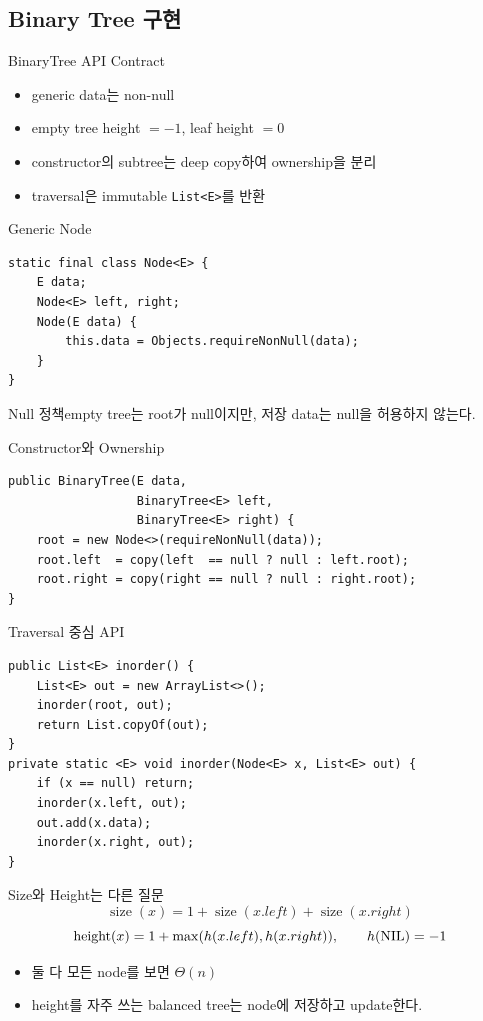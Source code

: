 \subsection{Binary Tree 구현}
\begin{frame}{BinaryTree API Contract}
\begin{itemize}
\item generic data는 non-null
\item empty tree height $=-1$, leaf height $=0$
\item constructor의 subtree는 deep copy하여 ownership을 분리
\item traversal은 immutable \texttt{List<E>}를 반환
\end{itemize}
\end{frame}
\begin{frame}[fragile]{Generic Node}
\begin{lstlisting}[style=jcode]
static final class Node<E> {
    E data;
    Node<E> left, right;
    Node(E data) {
        this.data = Objects.requireNonNull(data);
    }
}
\end{lstlisting}
\begin{block}{Null 정책}empty tree는 root가 null이지만, 저장 data는 null을 허용하지 않는다.\end{block}
\end{frame}
\begin{frame}[fragile]{Constructor와 Ownership}
\begin{lstlisting}[style=jcode]
public BinaryTree(E data,
                  BinaryTree<E> left,
                  BinaryTree<E> right) {
    root = new Node<>(requireNonNull(data));
    root.left  = copy(left  == null ? null : left.root);
    root.right = copy(right == null ? null : right.root);
}
\end{lstlisting}
\end{frame}
\begin{frame}[fragile]{Traversal 중심 API}
\begin{lstlisting}[style=jcode]
public List<E> inorder() {
    List<E> out = new ArrayList<>();
    inorder(root, out);
    return List.copyOf(out);
}
private static <E> void inorder(Node<E> x, List<E> out) {
    if (x == null) return;
    inorder(x.left, out);
    out.add(x.data);
    inorder(x.right, out);
}
\end{lstlisting}
\end{frame}
\begin{frame}{Size와 Height는 다른 질문}
\[
\operatorname{size}(x)=1+\operatorname{size}(x.left)+\operatorname{size}(x.right)
\]
\[
\operatorname{height}(x)=1+\max(h(x.left),h(x.right)),\qquad h(\mathrm{NIL})=-1
\]
\begin{itemize}\item 둘 다 모든 node를 보면 $\Theta(n)$\item height를 자주 쓰는 balanced tree는 node에 저장하고 update한다.\end{itemize}
\end{frame}
